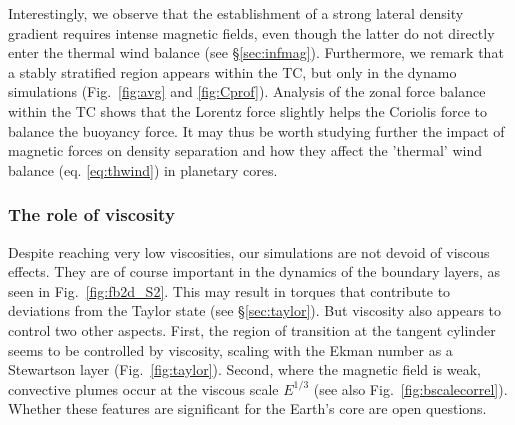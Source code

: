 \documentclass[12pt, a4paper]{article}
\begin{document}
Interestingly, we observe that the establishment of a strong lateral density gradient requires intense magnetic fields, even though the latter do not directly enter the thermal wind balance (see \S\ref{sec:infmag}).
Furthermore, we remark that a stably stratified region appears within the TC, but only in the dynamo simulations (Fig.~\ref{fig:avg} and \ref{fig:Cprof}).
Analysis of the zonal force balance within the TC shows that the Lorentz force slightly helps the Coriolis force to balance the buoyancy force.
It may thus be worth studying further the impact of magnetic forces on density separation and how they affect the 'thermal' wind balance (eq. \ref{eq:thwind}) in planetary cores.



\subsubsection{The role of viscosity}

Despite reaching very low viscosities, our simulations are not devoid of viscous effects.
They are of course important in the dynamics of the boundary layers, as seen in Fig.~\ref{fig:fb2d_S2}.
This may result in torques that contribute to deviations from the Taylor state (see \S\ref{sec:taylor}).
But viscosity also appears to control two other aspects.
First, the region of transition at the tangent cylinder seems to be controlled by viscosity, scaling with the Ekman number as a Stewartson layer (Fig.~\ref{fig:taylor}).
Second, where the magnetic field is weak, convective plumes occur at the viscous scale $E^{1/3}$ (see also Fig.~\ref{fig:bscalecorrel}).
Whether these features are significant for the Earth's core are open questions.

%
%
\end{document}
